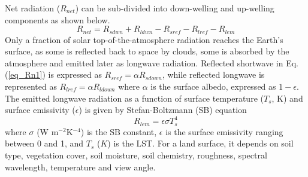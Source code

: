 \documentclass[fleqn,10pt]{wlscirep}
\begin{document}

 Net radiation ($R_{net}$) can be sub-divided into down-welling and up-welling components \cite{verma2016global} as shown below.
\begin{equation}\label{eq_Rn1}
R_{net} = R_{sdwn} + R_{ldwn} - R_{sref} - R_{lref} - R_{lem}
\end{equation}
 Only a fraction of solar top-of-the-atmosphere radiation reaches the Earth's surface, as some is reflected back to space by clouds, some is absorbed by the atmosphere and emitted later as longwave radiation. Reflected shortwave in Eq. ({\ref{eq_Rn1}}) is expressed as $R_{sref} = \alpha R_{sdown}$, while reflected longwave is represented as $R_{lref} = \alpha R_{ldown}$ where $\alpha$ is the surface albedo, expressed as $1 - \epsilon$. The emitted longwave radiation as a function of surface temperature ($T_s$, K) and surface emissivity ($\epsilon$) is given by Stefan-Boltzmann (SB) equation \cite{lhomme1988radiative}
\begin{equation}\label{eq_Rlem}
R_{lem}= \epsilon \sigma T_{s}^{4}
\end{equation}
where $\sigma$ (W m$^{-2}$K$^{-4}$) is the SB constant, $\epsilon$ is the surface emissivity ranging between 0 and 1, and $T_{s}$ ($K$) is the LST. For a land surface, it depends on soil type, vegetation cover, soil moisture, soil chemistry, roughness, spectral wavelength, temperature and view angle\cite{norman1995terminology}. 
\end{document}
